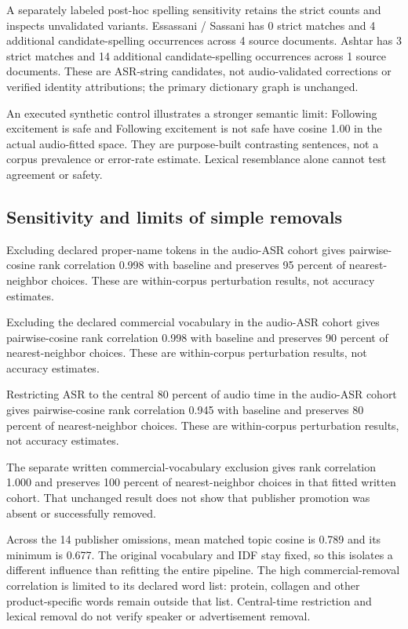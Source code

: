 A separately labeled post-hoc spelling sensitivity retains the strict counts and inspects unvalidated variants. Essassani / Sassani has 0 strict matches and 4 additional candidate-spelling occurrences across 4 source documents. Ashtar has 3 strict matches and 14 additional candidate-spelling occurrences across 1 source documents. These are ASR-string candidates, not audio-validated corrections or verified identity attributions; the primary dictionary graph is unchanged.

An executed synthetic control illustrates a stronger semantic limit: Following excitement is safe and Following excitement is not safe have cosine 1.00 in the actual audio-fitted space. They are purpose-built contrasting sentences, not a corpus prevalence or error-rate estimate. Lexical resemblance alone cannot test agreement or safety.

\subsection{Sensitivity and limits of simple removals}

Excluding declared proper-name tokens in the audio-ASR cohort gives pairwise-cosine rank correlation 0.998 with baseline and preserves 95 percent of nearest-neighbor choices. These are within-corpus perturbation results, not accuracy estimates.

Excluding the declared commercial vocabulary in the audio-ASR cohort gives pairwise-cosine rank correlation 0.998 with baseline and preserves 90 percent of nearest-neighbor choices. These are within-corpus perturbation results, not accuracy estimates.

Restricting ASR to the central 80 percent of audio time in the audio-ASR cohort gives pairwise-cosine rank correlation 0.945 with baseline and preserves 80 percent of nearest-neighbor choices. These are within-corpus perturbation results, not accuracy estimates.

The separate written commercial-vocabulary exclusion gives rank correlation 1.000 and preserves 100 percent of nearest-neighbor choices in that fitted written cohort. That unchanged result does not show that publisher promotion was absent or successfully removed.

Across the 14 publisher omissions, mean matched topic cosine is 0.789 and its minimum is 0.677. The original vocabulary and IDF stay fixed, so this isolates a different influence than refitting the entire pipeline. The high commercial-removal correlation is limited to its declared word list: protein, collagen and other product-specific words remain outside that list. Central-time restriction and lexical removal do not verify speaker or advertisement removal.

